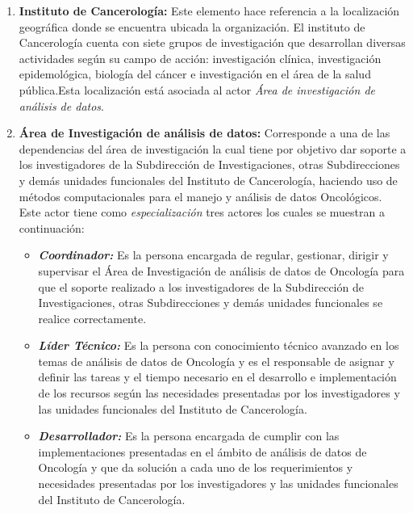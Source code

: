 \begin{enumerate}[label=\textbf{\arabic*})]
\item  \textbf{\textbf{Instituto  de Cancerología}:} Este elemento hace referencia a la localización geográfica donde se encuentra ubicada  la organización. El instituto de  Cancerología cuenta con siete grupos de investigación que desarrollan diversas actividades según su campo de acción: investigación clínica, investigación epidemológica, biología del cáncer e investigación en el área de la salud pública.Esta localización está asociada al actor \textit{Área de investigación de análisis de datos}.


\item \textbf{Área de Investigación de análisis de datos:} Corresponde a una de las dependencias del área de investigación la cual  tiene por objetivo dar soporte a los investigadores de la Subdirección de Investigaciones, otras Subdirecciones y demás unidades funcionales del Instituto  de Cancerología, haciendo uso de métodos computacionales para el manejo y análisis de datos Oncológicos. Este actor tiene como \textit{especialización} tres actores los cuales se muestran a continuación:
\newpage
\begin{itemize}
    \item  \textbf{\textit{Coordinador:}}
	Es la persona encargada de regular, gestionar, dirigir y supervisar el Área de Investigación de análisis de datos de Oncología para que el soporte realizado a los investigadores de la Subdirección de Investigaciones, otras Subdirecciones y demás unidades funcionales se realice correctamente.
	
	\item  \textbf{\textit{Líder Técnico:}}
	Es la persona con conocimiento técnico avanzado en los temas de análisis de datos de Oncología y es el  responsable de asignar y definir las  tareas y el tiempo necesario en el desarrollo e implementación de los recursos  según las necesidades presentadas por los investigadores y las unidades funcionales del Instituto  de Cancerología.
	\item  \textbf{\textit{Desarrollador:}}
	Es la persona encargada de cumplir con las implementaciones presentadas en el ámbito de análisis de datos de Oncología y que da  solución a cada uno de los requerimientos y necesidades presentadas por los  investigadores y las unidades funcionales del Instituto  de Cancerología.
	
\end{itemize}

\end{enumerate}

